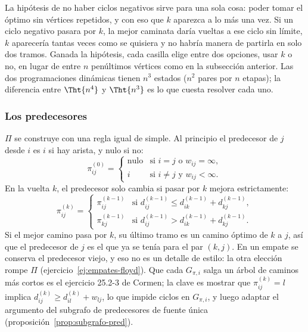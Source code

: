 \documentclass[11pt,letterpaper]{article}
\begin{document}
\begin{idea}
  La hipótesis de no haber ciclos negativos sirve para una sola cosa:
  poder tomar el óptimo sin vértices repetidos, y con eso que $k$
  aparezca a lo más una vez. Si un ciclo negativo pasara por $k$, la
  mejor caminata daría vueltas a ese ciclo sin límite, $k$ aparecería
  tantas veces como se quisiera y no habría manera de partirla en solo
  dos tramos. Ganada la hipótesis, cada casilla elige entre dos
  opciones, usar $k$ o no, en lugar de entre $n$ penúltimos vértices
  como en la subsección anterior. Las dos programaciones dinámicas
  tienen $n^3$ estados ($n^2$ pares por $n$ etapas); la diferencia
  entre $\Tht{n^4}$ y $\Tht{n^3}$ es lo que cuesta resolver cada uno.
\end{idea}

\subsubsection*{Los predecesores}

$\Pi$ se construye con una regla igual de simple. Al principio el
predecesor de $j$ desde $i$ es $i$ si hay arista, y nulo si no:
\[
  \pi^{(0)}_{ij} = \begin{cases}
    \text{nulo} & \text{si } i = j \text{ o } w_{ij} = \infty, \\
    i & \text{si } i \neq j \text{ y } w_{ij} < \infty .
  \end{cases}
\]
En la vuelta $k$, el predecesor solo cambia si pasar por $k$ mejora
estrictamente:
\[
  \pi^{(k)}_{ij} = \begin{cases}
    \pi^{(k-1)}_{ij} & \text{si } d^{(k-1)}_{ij} \le
                       d^{(k-1)}_{ik} + d^{(k-1)}_{kj}, \\
    \pi^{(k-1)}_{kj} & \text{si } d^{(k-1)}_{ij} >
                       d^{(k-1)}_{ik} + d^{(k-1)}_{kj}.
  \end{cases}
\]
Si el mejor camino pasa por $k$, su último tramo es un camino óptimo
de $k$ a $j$, así que el predecesor de $j$ es el que ya se tenía para
el par $(k, j)$. En un empate se conserva el predecesor viejo, y eso
no es un detalle de estilo: la otra elección rompe $\Pi$
(ejercicio~\ref{ej:empates-floyd}). Que cada $G_{\pi,i}$ salga un
árbol de caminos más cortos es el ejercicio 25.2-3 de Cormen; la clave
es mostrar que $\pi^{(k)}_{ij} = l$ implica
$d^{(k)}_{ij} \ge d^{(k)}_{il} + w_{lj}$, lo que impide ciclos en
$G_{\pi,i}$, y luego adaptar el argumento del subgrafo de
predecesores de fuente única
(proposición~\ref{prop:subgrafo-pred}).
\end{document}
